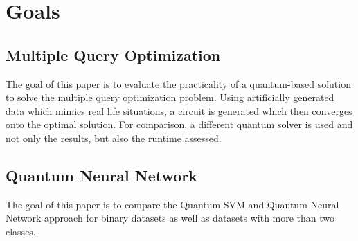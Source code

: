 \section{Goals}

\subsection{Multiple Query Optimization}
The goal of this paper is to evaluate the practicality of a quantum-based solution to solve the multiple query optimization problem. Using artificially generated data which mimics real life situations, a circuit is generated which then converges onto the optimal solution. For comparison, a different quantum solver is used and not only the results, but also the runtime assessed.

\subsection{Quantum Neural Network}
The goal of this paper is to compare the Quantum SVM and Quantum Neural Network approach for binary datasets as well as datasets with more than two classes.

\newpage
